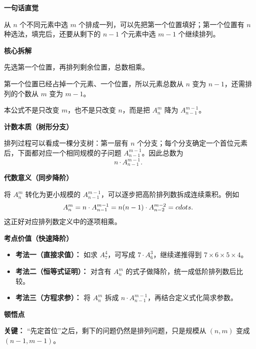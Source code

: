 \begin{explanationbox}
\textbf{\textcolor{CExplanation}{一句话直觉}}

从 $n$ 个不同元素中选 $m$ 个排成一列，可以先把第一个位置填好；第一个位置有 $n$ 种选法，填完后，还要从剩下的 $n-1$ 个元素中选 $m-1$ 个继续排列。

\medskip
\textbf{\textcolor{CExplanation}{核心拆解}}
\begin{description}[style=nextline, leftmargin=2.8em, labelsep=0.5em, itemsep=0.45em]
    \item[\textbf{要点一（分步计数原理）：}] 先选第一个位置，再排列剩余位置，总数相乘。
    \item[\textbf{要点二（参数同步减少）：}] 第一个位置已经占掉一个元素、一个位置，所以元素总数从 $n$ 变为 $n-1$，还需排列的个数从 $m$ 变为 $m-1$。
    \item[\textbf{要点三（递推方向）：}] 本公式不是只改变 $m$，也不是只改变 $n$，而是把 $A_n^m$ 降为 $A_{n-1}^{m-1}$。
\end{description}

\medskip
\textbf{\textcolor{CExplanation}{计数本质（树形分支）}}

排列过程可以看成一棵分支树：第一层有 $n$ 个分支；每个分支确定一个首位元素后，下面都对应一个相同规模的子问题 $A_{n-1}^{m-1}$。因此总数为
\[
    n\cdot A_{n-1}^{m-1}.
\]

\medskip
\textbf{\textcolor{CExplanation}{代数意义（同步降阶）}}

将 $A_n^m$ 转化为更小规模的 $A_{n-1}^{m-1}$，可以逐步把高阶排列数拆成连续乘积。例如
\[
A_n^m=n\cdot A_{n-1}^{m-1}
= n(n-1)\cdot A_{n-2}^{m-2}=\\cdots.
\]
这正好对应排列数定义中的逐项相乘。

\medskip
\textbf{\textcolor{CExplanation}{考点价值（快速降阶）}}
\begin{itemize}[leftmargin=*, itemsep=0.5em, topsep=0.4em]
    \item \textbf{考法一（直接求值）：} 如求 $A_7^4$，可写成 $7\cdot A_6^3$，继续递推得到 $7\times6\times5\times4$。
    \item \textbf{考法二（恒等式证明）：} 对含有 $A_n^m$ 的式子做降阶，统一成低阶排列数后比较。
    \item \textbf{考法三（方程求参）：} 将 $A_n^m$ 拆成 $n\cdot A_{n-1}^{m-1}$，再结合定义式化简求参数。
\end{itemize}

\medskip
\textbf{\textcolor{CExplanation}{顿悟点}}

\textbf{关键：} “先定首位”之后，剩下的问题仍然是排列问题，只是规模从 $(n,m)$ 变成 $(n-1,m-1)$。


\end{explanationbox}
